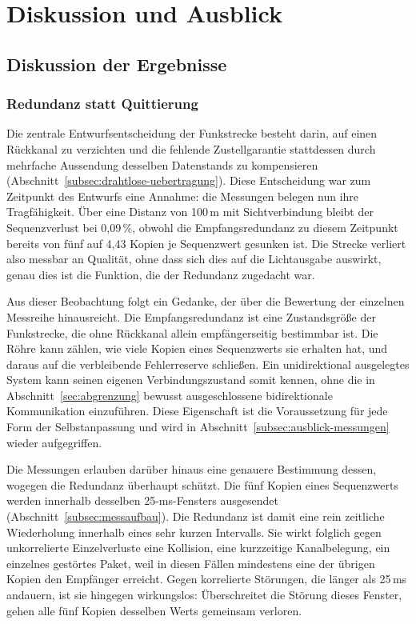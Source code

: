 \chapter{Diskussion und Ausblick}
\label{chap:diskussion-und-ausblick}

\section{Diskussion der Ergebnisse}
\label{sec:diskussion-der-ergebnisse}

\subsection{Redundanz statt Quittierung}
\label{subsec:diskussion-redundanz}

Die zentrale Entwurfsentscheidung der Funkstrecke besteht darin, auf einen
Rückkanal zu verzichten und die fehlende Zustellgarantie stattdessen durch
mehrfache Aussendung desselben Datenstands zu kompensieren
(Abschnitt~\ref{subsec:drahtlose-uebertragung}). Diese Entscheidung war zum
Zeitpunkt des Entwurfs eine Annahme: die Messungen belegen nun ihre
Tragfähigkeit. Über eine Distanz von 100\,m mit Sichtverbindung bleibt der
Sequenzverlust bei 0,09\,\%, obwohl die Empfangsredundanz zu diesem Zeitpunkt
bereits von fünf auf 4,43 Kopien je Sequenzwert gesunken ist. Die Strecke
verliert also messbar an Qualität, ohne dass sich dies auf die Lichtausgabe
auswirkt, genau dies ist die Funktion, die der Redundanz zugedacht war.

Aus dieser Beobachtung folgt ein Gedanke, der über die Bewertung der einzelnen
Messreihe hinausreicht. Die Empfangsredundanz ist eine Zustandsgröße der
Funkstrecke, die ohne Rückkanal allein empfängerseitig bestimmbar ist. Die
Röhre kann zählen, wie viele Kopien eines Sequenzwerts sie erhalten hat, und
daraus auf die verbleibende Fehlerreserve schließen. Ein unidirektional
ausgelegtes System kann seinen eigenen Verbindungszustand somit kennen, ohne die
in Abschnitt~\ref{sec:abgrenzung} bewusst ausgeschlossene bidirektionale
Kommunikation einzuführen. Diese Eigenschaft ist die Voraussetzung für jede Form
der Selbstanpassung und wird in Abschnitt~\ref{subsec:ausblick-messungen} wieder
aufgegriffen.

Die Messungen erlauben darüber hinaus eine genauere Bestimmung dessen, wogegen
die Redundanz überhaupt schützt. Die fünf Kopien eines Sequenzwerts werden
innerhalb desselben 25-ms-Fensters ausgesendet
(Abschnitt~\ref{subsec:messaufbau}). Die Redundanz ist damit eine rein zeitliche
Wiederholung innerhalb eines sehr kurzen Intervalls. Sie wirkt folglich gegen
unkorrelierte Einzelverluste eine Kollision, eine kurzzeitige
Kanalbelegung, ein einzelnes gestörtes Paket, weil in diesen Fällen mindestens
eine der übrigen Kopien den Empfänger erreicht. Gegen korrelierte Störungen,
die länger als 25\,ms andauern, ist sie hingegen wirkungslos: Überschreitet die
Störung dieses Fenster, gehen alle fünf Kopien desselben Werts gemeinsam verloren.

